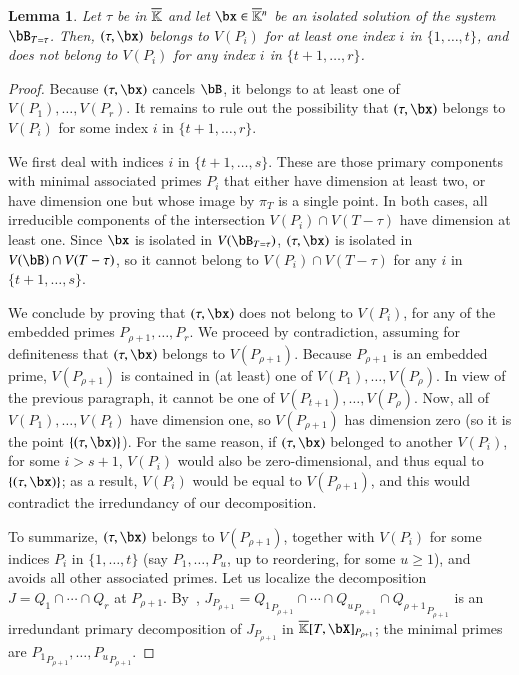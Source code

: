 \documentclass[amsthm]{elsart}
\newtheorem{lemma}[definition]{Lemma}
\begin{document}
\begin{lemma}\label{lemma:vPi}
  Let $\tau$ be in $\overline{\mathbb{K}}$ and let $\bx \in \KKbar{}^n$ be an isolated
  solution of the system $\bB_{T=\tau}$. Then, $(\tau,\bx)$ belongs to $V(P_i)$
  for at least one index $i$ in $\{1,\dots,t\}$, and does not belong
  to $V(P_i)$ for any index $i$ in $\{t+1,\dots,r\}$.
\end{lemma}
\begin{proof}
  Because $(\tau,\bx)$ cancels $\bB$, it belongs to at least one of
  $V(P_1),\dots,V(P_r)$. It remains to rule out the possibility that
  $(\tau,\bx)$ belongs to $V(P_i)$ for some index $i$ in
  $\{t+1,\dots,r\}$.

  We first deal with indices $i$ in $\{t+1,\dots,s\}$. These are those
  primary components with minimal associated primes $P_i$ that either
  have dimension at least two, or have dimension one but whose image
  by $\pi_T$ is a single point. In both cases, all irreducible
  components of the intersection $V(P_i)\cap V(T-\tau)$ have dimension
  at least one. Since $\bx$ is isolated in $V(\bB_{T=\tau})$, $(\tau,\bx)$ is
  isolated in $V(\bB)\cap V(T-\tau)$, so it cannot belong to
  $V(P_i)\cap V(T-\tau)$ for any $i$ in $\{t+1,\dots,s\}$.
  
  We conclude by proving that $(\tau,\bx)$ does not belong to $V(P_i)$,
  for any of the embedded primes $P_{\rho+1},\dots,P_r$. We proceed by
  contradiction, assuming for definiteness that $(\tau,\bx)$ belongs to
  $V(P_{\rho+1})$. Because $P_{\rho+1}$ is an embedded prime, $V(P_{\rho+1})$
  is contained in (at least) one of $V(P_1),\dots,V(P_\rho)$. In view of
  the previous paragraph, it cannot be one of
  $V(P_{t+1}),\dots,V(P_\rho)$.  Now, all of $V(P_1),\dots,V(P_t)$ have
  dimension one, so $V(P_{\rho+1})$ has dimension zero (so it is the point $\{(\tau,\bx)\}$). For the same
  reason, if $(\tau,\bx)$ belonged to another $V(P_i)$, for some $i >
  s+1$, $V(P_i)$ would also be zero-dimensional, and thus equal to $\{(\tau,\bx)\}$; as a result, $V(P_i)$
  would be equal to $V(P_{\rho+1})$, and this would contradict the
  irredundancy of our decomposition.
  
  To summarize, $(\tau,\bx)$ belongs to $V(P_{\rho+1})$, together with
  $V(P_i)$ for some indices $P_i$ in $\{1,\dots,t\}$ (say
  $P_1,\dots,P_u$, up to reordering, for some $u \ge 1$), and avoids
  all other associated primes.  Let us localize the decomposition
  $J=Q_1 \cap \cdots \cap Q_r$ at
  $P_{\rho+1}$. By~\cite[Proposition~4.9]{AtMc},
  $J_{P_{\rho+1}}={Q_1}_{P_{\rho+1}} \cap \cdots \cap {Q_u}_{P_{\rho+1}}\cap
  {Q_{\rho+1}}_{P_{\rho+1}}$ is an irredundant primary decomposition of
  $J_{P_{\rho+1}}$ in $\KKbar[T,\bX]_{P_{\rho+1}}$; the minimal primes are
  ${P_1}_{P_{\rho+1}},\dots,{P_u}_{P_{\rho+1}}$.


\end{proof}
\end{document}
